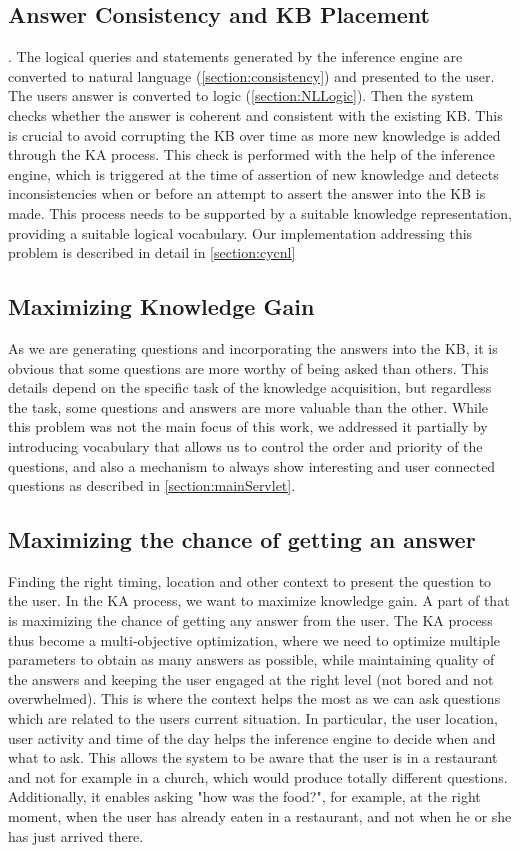 \subsection{Answer Consistency and KB Placement}. 
The logical queries and statements generated by the inference engine are 
converted to natural language (\autoref{section:consistency}) and presented to 
the user. The users answer is converted to logic (\autoref{section:NLLogic}). 
Then the system checks whether the answer is coherent and consistent with the 
existing KB. This is crucial to avoid corrupting the KB over time as more new 
knowledge is added through the KA process. This check is performed with the 
help of the inference engine, which is triggered at the time of assertion of 
new knowledge and detects inconsistencies when or before an attempt to 
assert the answer into the KB is made. This process needs to be supported by a 
suitable knowledge representation, providing a suitable logical vocabulary. 
Our implementation addressing this problem is described in detail in 
\autoref{section:cycnl}

\subsection{Maximizing Knowledge Gain} 
As we are generating questions and incorporating the answers into the KB, it 
is obvious that some questions are more worthy of being asked than others. 
This details depend on the specific task of the knowledge acquisition, but 
regardless the task, some questions and answers are more valuable than the 
other. While this problem was not the main focus of this work, we addressed it 
partially by introducing vocabulary that allows us to control the order and 
priority of the questions, and also a mechanism to always show interesting
and user connected questions as described in \autoref{section:mainServlet}.

\subsection{Maximizing the chance of getting an answer}
Finding the right timing, location and other context to present the question
to the user. In the KA process, we want to maximize knowledge gain. A part of 
that is maximizing the chance of getting any answer from the user. The KA 
process thus become a multi-objective optimization, where we need to optimize 
multiple parameters to obtain as many answers as possible, while maintaining 
quality of the answers and keeping the user engaged at the right level (not 
bored and not overwhelmed). This is where the context helps the most as we can 
ask questions which are related to the users current situation. In particular, 
the user location, user activity and time of the day helps the inference 
engine to decide when and what to ask. This allows the system to be aware that 
the user is in a restaurant and not for example in a church, which would 
produce  totally different questions. Additionally, it enables asking 
"how was the food?", for example, at the right moment, when the user has 
already eaten in a restaurant, and not when he or she has just arrived there.


